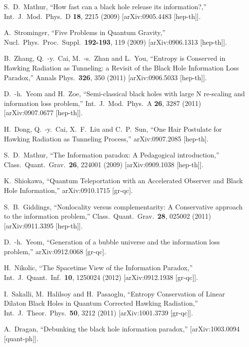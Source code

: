 \documentclass[12pt]{article}
\begin{document}
\begin{thebibliography}{99}
  S.~D.~Mathur,
  ``How fast can a black hole release its information?,''
  Int.\ J.\ Mod.\ Phys.\ D {\bf 18}, 2215 (2009)
  [arXiv:0905.4483 [hep-th]].

  A.~Strominger,
  ``Five Problems in Quantum Gravity,''
  Nucl.\ Phys.\ Proc.\ Suppl.\  {\bf 192-193}, 119 (2009)
  [arXiv:0906.1313 [hep-th]].

  B.~Zhang, Q.~-y.~Cai, M.~-s.~Zhan and L.~You,
  ``Entropy is Conserved in Hawking Radiation as Tunneling: a Revisit of the Black Hole Information Loss Paradox,''
  Annals Phys.\  {\bf 326}, 350 (2011)
  [arXiv:0906.5033 [hep-th]].

  D.~-h.~Yeom and H.~Zoe,
  ``Semi-classical black holes with large N re-scaling and information loss problem,''
  Int.\ J.\ Mod.\ Phys.\ A {\bf 26}, 3287 (2011)
  [arXiv:0907.0677 [hep-th]].

  H.~Dong, Q.~-y.~Cai, X.~F.~Liu and C.~P.~Sun,
  ``One Hair Postulate for Hawking Radiation as Tunneling Process,''
  arXiv:0907.2085 [hep-th].

  S.~D.~Mathur,
  ``The Information paradox: A Pedagogical introduction,''
  Class.\ Quant.\ Grav.\  {\bf 26}, 224001 (2009)
  [arXiv:0909.1038 [hep-th]].

  K.~Shiokawa,
  ``Quantum Teleportation with an Accelerated Observer and Black Hole Information,''
  arXiv:0910.1715 [gr-qc].

  S.~B.~Giddings,
  ``Nonlocality versus complementarity: A Conservative approach to the information problem,''
  Class.\ Quant.\ Grav.\  {\bf 28}, 025002 (2011)
  [arXiv:0911.3395 [hep-th]].

  D.~-h.~Yeom,
  ``Generation of a bubble universe and the information loss problem,''
  arXiv:0912.0068 [gr-qc].

  H.~Nikolic,
  ``The Spacetime View of the Information Paradox,''
  Int.\ J.\ Quant.\ Inf.\  {\bf 10}, 1250024 (2012)
  [arXiv:0912.1938 [gr-qc]].

  I.~Sakalli, M.~Halilsoy and H.~Pasaoglu,
  ``Entropy Conservation of Linear Dilaton Black Holes in Quantum Corrected Hawking Radiation,''
  Int.\ J.\ Theor.\ Phys.\  {\bf 50}, 3212 (2011)
  [arXiv:1001.3739 [gr-qc]].

  A.~Dragan,
  ``Debunking the black hole information paradox,''
  [arXiv:1003.0094 [quant-ph]].


\end{thebibliography}
\end{document}
